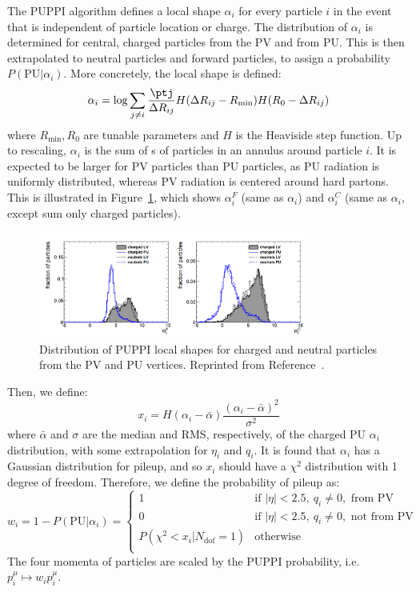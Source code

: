 The PUPPI algorithm defines a local shape $\alpha_i$ for every particle $i$ in the event that is independent of particle location or charge.
The distribution of $\alpha_i$ is determined for central, charged particles from the PV and from PU.
This is then extrapolated to neutral particles and forward particles, to assign a probability $P(\mathrm{PU}|\alpha_i)$. 
More concretely, the local shape is defined:
\begin{equation}
	\alpha_i = \log \sum_{j \neq i} \frac{\ptj}{\Delta R_{ij}} H(\Delta R_{ij} - R_{\min})H(R_0 - \Delta R_{ij})
\end{equation}
where $R_{\min}, R_0$ are tunable parameters and $H$ is the Heaviside step function. 
Up to rescaling, $\alpha_i$ is the sum of \pt s of particles in an annulus around particle $i$. 
It is expected to be larger for PV particles than PU particles, as PU radiation is uniformly distributed, whereas PV radiation is centered around hard partons.
This is illustrated in Figure~\ref{fig:cms:puppi}, which shows $\alpha_i^F$ (same as $\alpha_i$) and $\alpha_i^C$ (same as $\alpha_i$, except sum only charged particles).

\begin{figure}[]
\begin{center}
	\includegraphics[width=0.8\textwidth]{figures/cms/puppi.png}
	\caption{Distribution of PUPPI local shapes for charged and neutral particles from the PV and PU vertices.
			 Reprinted from Reference~\cite{puppi}.}
	\label{fig:cms:puppi}
\end{center}
\end{figure}

Then, we define:
\begin{equation}
	x_i = H(\alpha_i - \bar\alpha) \frac{(\alpha_i - \bar\alpha)^2}{\sigma^2}
\end{equation}
where $\bar\alpha$ and $\sigma$ are the median and RMS, respectively, of the charged PU $\alpha_i$ distribution, with some extrapolation for $\eta_i$ and $q_i$.
It is found that $\alpha_i$ has a Gaussian distribution for pileup, and so $x_i$ should have a $\chi^2$ distribution with 1 degree of freedom.
Therefore, we define the probability of pileup as:
\begin{equation}
w_i = 1 - P(\mathrm{PU}|\alpha_i) = 
	\begin{cases}
		1 & \text{if }|\eta|<2.5,~q_i \neq 0, \text{ from PV} \\ 
		0 & \text{if }|\eta|<2.5,~q_i \neq 0, \text{ not from PV} \\ 
		P(\chi^2<x_i | N_\mathrm{dof}=1)  & \text{otherwise} \\ 
	\end{cases}
\end{equation}
The four momenta of particles are scaled by the PUPPI probability, i.e. $p_i^\mu \mapsto w_i p_i^\mu$.

